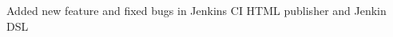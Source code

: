 \begin{cventries}
  \cventry
    {
      \begin{cvitems}
        \item {Added new feature and fixed bugs in Jenkins CI HTML publisher and Jenkin DSL }
      \end{cvitems}
    }
\end{cventries}
